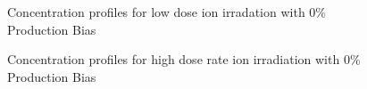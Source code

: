\documentclass[a4paper]{article}
\begin{document}
\begin{figure}[h!]
        \caption{Concentration profiles for low dose ion irradation with 0\% Production Bias}
        \label{figure:concentrations_ion_0_1e-6}
      \end{figure}
      \begin{figure}[h!]  %
        \centering
        \qquad
        \caption{Concentration profiles for high dose rate ion irradiation with 0\% Production Bias}
        \label{figure:concentrations_ion_0_1e-3}
      \end{figure}
\end{document}
